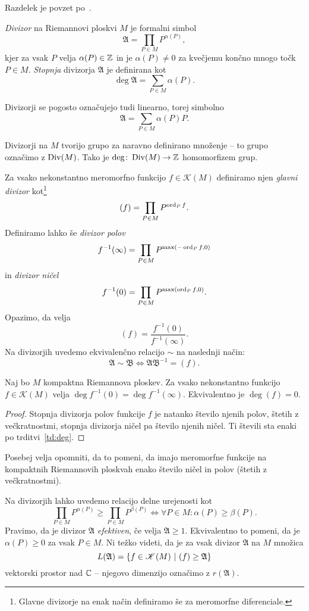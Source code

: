 Razdelek je povzet po~\cite[poglavje III.4]{Farkas_Kra_1980}.

\begin{definicija}
\emph{Divizor} na Riemannovi ploskvi $M$ je formalni simbol
\[
\mathfrak{A} = \prod_{P \in M} P^{\alpha(P)},
\]
kjer za vsak $P$ velja $\alpha(P) \in \mathbb{Z}$ in je $\alpha(P) \ne 0$
za kvečjemu končno mnogo točk $P \in M$. \emph{Stopnja} divizorja
$\mathfrak{A}$ je definirana kot
\[
\deg \mathfrak{A} = \sum_{P \in M} \alpha(P).
\]
\end{definicija}

Divizorji se pogosto označujejo tudi linearno, torej simbolno
\[
\mathfrak{A} = \sum_{P \in M} \alpha(P) P.
\]

Divizorji na $M$ tvorijo grupo za naravno definirano množenje --
to grupo označimo z $\operatorname{Div}(M)$. Tako je
$\deg \colon \operatorname{Div}(M) \to \mathbb{Z}$ homomorfizem grup.

Za vsako nekonstantno meromorfno funkcijo $f \in \mathscr{K}(M)$
definiramo njen \emph{glavni divizor} kot\footnote{Glavne divizorje
na enak način definiramo še za meromorfne diferenciale.}
\[
(f) = \prod_{P \in M} P^{\operatorname{ord}_P f}.
\]
Definiramo lahko še \emph{divizor polov}
\[
f^{-1}(\infty) = \prod_{P \in M} P^{\max(-\operatorname{ord}_P f, 0)}
\]
in \emph{divizor ničel}
\[
f^{-1}(0) = \prod_{P \in M} P^{\max(\operatorname{ord}_P f, 0)}.
\]
Opazimo, da velja
\[
(f) = \frac{f^{-1}(0)}{f^{-1}(\infty)}.
\]
Na divizorjih uvedemo ekvivalenčno relacijo $\sim$ na naslednji način:
\[
\mathfrak{A} \sim \mathfrak{B} \iff
\mathfrak{A} \mathfrak{B}^{-1} = (f).
\]

\begin{lema}
Naj bo $M$ kompaktna Riemannova ploskev. Za vsako nekonstantno
funkcijo $f \in \mathscr{K}(M)$ velja
$\deg f^{-1}(0) = \deg f^{-1}(\infty)$. Ekvivalentno je
$\deg (f) = 0$.
\end{lema}

\begin{proof}
Stopnja divizorja polov funkcije $f$ je natanko število njenih
polov, štetih z večkratnostmi, stopnja divizorja ničel pa
število njenih ničel. Ti števili sta enaki po
trditvi~\ref{td:deg}.
\end{proof}

Posebej velja opomniti, da to pomeni, da imajo meromorfne funkcije
na kompaktnih Riemannovih ploskvah enako število ničel in polov
(štetih z večkratnostmi).

Na divizorjih lahko uvedemo relacijo delne urejenosti kot
\[
\prod_{P \in M} P^{\alpha(P)} \geq \prod_{P \in M} P^{\beta(P)}
\iff
\forall P \in M \colon \alpha(P) \geq \beta(P).
\]
Pravimo, da je divizor $\mathfrak{A}$ \emph{efektiven}, če velja
$\mathfrak{A} \geq 1$. Ekvivalentno to pomeni, da je
$\alpha(P) \geq 0$ za vsak $P \in M$. Ni težko videti, da je za
vsak divizor $\mathfrak{A}$ na $M$ množica
\[
L(\mathfrak{A}) =
\left\{f \in \mathscr{K}(M)~\middle\vert~(f) \geq \mathfrak{A}\right\}
\]
vektorski prostor nad $\mathbb{C}$ -- njegovo dimenzijo označimo z
$r(\mathfrak{A})$.

